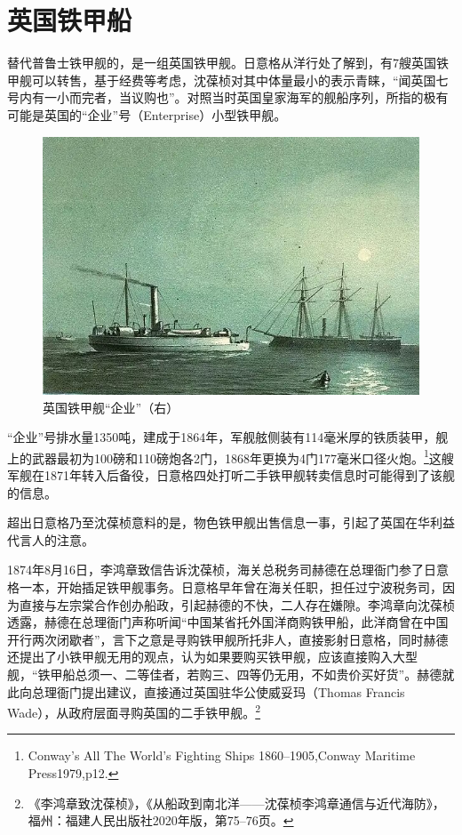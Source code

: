 \documentclass[12pt,UTF8]{ctexbook}
\begin{document}
\section{英国铁甲船}

替代普鲁士铁甲舰的，是一组英国铁甲舰。日意格从洋行处了解到，有7艘英国铁甲舰可以转售，基于经费等考虑，沈葆桢对其中体量最小的表示青睐，“闻英国七号内有一小而完者，当议购也”。对照当时英国皇家海军的舰船序列，所指的极有可能是英国的“企业”号（Enterprise）小型铁甲舰。

\begin{figure}[htbp]
	\centering
	\includegraphics[width=1\linewidth]{Images/45}
	\caption{英国铁甲舰“企业”（右）}
	\label{fig:1}
\end{figure}

“企业”号排水量1350吨，建成于1864年，军舰舷侧装有114毫米厚的铁质装甲，舰上的武器最初为100磅和110磅炮各2门，1868年更换为4门177毫米口径火炮。\footnote{Conway's All The World's Fighting Ships 1860--1905,Conway Maritime Press1979,p12.}这艘军舰在1871年转入后备役，日意格四处打听二手铁甲舰转卖信息时可能得到了该舰的信息。

超出日意格乃至沈葆桢意料的是，物色铁甲舰出售信息一事，引起了英国在华利益代言人的注意。

1874年8月16日，李鸿章致信告诉沈葆桢，海关总税务司赫德在总理衙门参了日意格一本，开始插足铁甲舰事务。日意格早年曾在海关任职，担任过宁波税务司，因为直接与左宗棠合作创办船政，引起赫德的不快，二人存在嫌隙。李鸿章向沈葆桢透露，赫德在总理衙门声称听闻“中国某省托外国洋商购铁甲船，此洋商曾在中国开行两次闭歇者”，言下之意是寻购铁甲舰所托非人，直接影射日意格，同时赫德还提出了小铁甲舰无用的观点，认为如果要购买铁甲舰，应该直接购入大型舰，“铁甲船总须一、二等佳者，若购三、四等仍无用，不如贵价买好货”。赫德就此向总理衙门提出建议，直接通过英国驻华公使威妥玛（Thomas Francis Wade），从政府层面寻购英国的二手铁甲舰。\footnote{《李鸿章致沈葆桢》，《从船政到南北洋——沈葆桢李鸿章通信与近代海防》，福州：福建人民出版社2020年版，第75--76页。}
\end{document}
